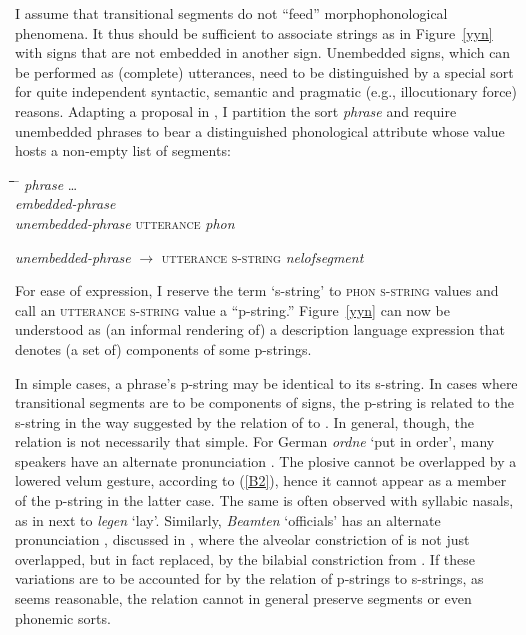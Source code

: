 \documentclass[output=paper]{langsci/langscibook}
\begin{document}
I assume that transitional segments do not ``feed'' morphophonological
phenomena. It thus should be sufficient to associate strings as
in Figure~\ref{yyn} with signs that are not embedded in another sign.
Unembedded signs, which can be performed as (complete) utterances, need to
be distinguished by a special sort for quite independent syntactic,
semantic and pragmatic (e.g., illocutionary force) reasons. Adapting a
proposal in \cite[134\hspace{1pt}ff.\@]{rich:97}, I
partition the sort \textit{phrase} and require unembedded phrases to bear a
distinguished phonological attribute whose value hosts a non-empty list of
segments: 
\begin{exe}
\ex
\label{partialoverlap}
\begin{tabbing}
\hspace{1,5em}\=\hspace{1,5em}\=\hspace{1,5em}\=\hspace{1,5em}\=\hspace{6em}
\=\kill
\textit{phrase}    \>\>\>\>\>                      \ldots\\
\>\textit{embedded-phrase}\\
\>\textit{unembedded-phrase}       \>\>\>\>\textsc{utterance} \textit{phon}
\end{tabbing}
\ex
\label{UTTnel}
\textit{unembedded-phrase} $\rightarrow$ \textsc{utterance s-string} \textit{nelofsegment} 
\end{exe}
% 
For ease of expression, I reserve the term `s-string' to \textsc{phon
  s-string} values and call an \textsc{utterance s-string} value a
``p-string.'' Figure~\ref{yyn} can now be understood as (an informal
rendering of) a description language expression that denotes (a set of)
components of some p-strings.


In simple cases, a phrase's p-string may be identical to its s-string. In
cases where transitional segments are to be components of signs, the
p-string is related to the s-string in the way suggested by the relation of
\textipa{[Y\~Yn]} to \textipa{[Yn]}. In general, though, the relation is
not necessarily that simple. For German \textipa{[OK.dn@]}
\emph{ordne} `put in order', many speakers have an alternate pronunciation
\textipa{[OK.n@]}. The plosive \textipa{[d]} cannot be overlapped by a
lowered velum gesture, according to (\ref{B2}), hence it cannot appear as a
member of the p-string in the latter case. The same is often observed with
syllabic nasals, as in \textipa{[le:.N]} next to \textipa{[le:.gN]}
\emph{legen} `lay'.  Similarly, \textipa{[b@.am.tn]} \emph{Beamten}
`officials' has an alternate pronunciation \textipa{[b@.am.pm]}, discussed
in \cite{kohl:92}, where the alveolar constriction of
\textipa{[tn]} is not just overlapped, but in fact replaced, by the
bilabial constriction from \textipa{[m]}. If these variations are to be
accounted for by the relation of p-strings to s-strings, as seems
reasonable, the relation cannot in general preserve segments or even
phonemic sorts.
\end{document}
